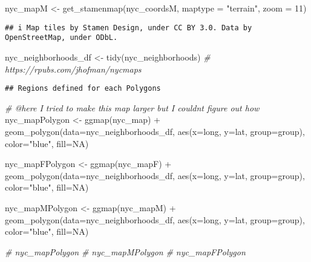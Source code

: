 \documentclass[
]{article}
\newenvironment{Shaded}{\begin{snugshade}}{\end{snugshade}}
\newcommand{\AttributeTok}[1]{\textcolor[rgb]{0.77,0.63,0.00}{#1}}
\newcommand{\CommentTok}[1]{\textcolor[rgb]{0.56,0.35,0.01}{\textit{#1}}}
\newcommand{\ConstantTok}[1]{\textcolor[rgb]{0.00,0.00,0.00}{#1}}
\newcommand{\DecValTok}[1]{\textcolor[rgb]{0.00,0.00,0.81}{#1}}
\newcommand{\FunctionTok}[1]{\textcolor[rgb]{0.00,0.00,0.00}{#1}}
\newcommand{\NormalTok}[1]{#1}
\newcommand{\OtherTok}[1]{\textcolor[rgb]{0.56,0.35,0.01}{#1}}
\newcommand{\SpecialCharTok}[1]{\textcolor[rgb]{0.00,0.00,0.00}{#1}}
\newcommand{\StringTok}[1]{\textcolor[rgb]{0.31,0.60,0.02}{#1}}
\begin{document}
\begin{Shaded}
\begin{Highlighting}[]
\NormalTok{nyc\_mapM }\OtherTok{\textless{}{-}} \FunctionTok{get\_stamenmap}\NormalTok{(nyc\_coordsM, }\AttributeTok{maptype =} \StringTok{"terrain"}\NormalTok{, }\AttributeTok{zoom =} \DecValTok{11}\NormalTok{)}
\end{Highlighting}
\end{Shaded}

\begin{verbatim}
## i Map tiles by Stamen Design, under CC BY 3.0. Data by OpenStreetMap, under ODbL.
\end{verbatim}

\begin{Shaded}
\begin{Highlighting}[]
\NormalTok{nyc\_neighborhoods\_df }\OtherTok{\textless{}{-}} \FunctionTok{tidy}\NormalTok{(nyc\_neighborhoods) }\CommentTok{\# https://rpubs.com/jhofman/nycmaps}
\end{Highlighting}
\end{Shaded}

\begin{verbatim}
## Regions defined for each Polygons
\end{verbatim}

\begin{Shaded}
\begin{Highlighting}[]
\CommentTok{\# @here I tried to make this map larger but I couldn\textquotesingle{}t figure out how}
\NormalTok{nyc\_mapPolygon }\OtherTok{\textless{}{-}} \FunctionTok{ggmap}\NormalTok{(nyc\_map) }\SpecialCharTok{+}
  \FunctionTok{geom\_polygon}\NormalTok{(}\AttributeTok{data=}\NormalTok{nyc\_neighborhoods\_df, }\FunctionTok{aes}\NormalTok{(}\AttributeTok{x=}\NormalTok{long, }\AttributeTok{y=}\NormalTok{lat, }\AttributeTok{group=}\NormalTok{group), }\AttributeTok{color=}\StringTok{"blue"}\NormalTok{, }\AttributeTok{fill=}\ConstantTok{NA}\NormalTok{)}

\NormalTok{nyc\_mapFPolygon }\OtherTok{\textless{}{-}} \FunctionTok{ggmap}\NormalTok{(nyc\_mapF) }\SpecialCharTok{+}
  \FunctionTok{geom\_polygon}\NormalTok{(}\AttributeTok{data=}\NormalTok{nyc\_neighborhoods\_df, }\FunctionTok{aes}\NormalTok{(}\AttributeTok{x=}\NormalTok{long, }\AttributeTok{y=}\NormalTok{lat, }\AttributeTok{group=}\NormalTok{group), }\AttributeTok{color=}\StringTok{"blue"}\NormalTok{, }\AttributeTok{fill=}\ConstantTok{NA}\NormalTok{)}

\NormalTok{nyc\_mapMPolygon }\OtherTok{\textless{}{-}} \FunctionTok{ggmap}\NormalTok{(nyc\_mapM) }\SpecialCharTok{+} 
  \FunctionTok{geom\_polygon}\NormalTok{(}\AttributeTok{data=}\NormalTok{nyc\_neighborhoods\_df, }\FunctionTok{aes}\NormalTok{(}\AttributeTok{x=}\NormalTok{long, }\AttributeTok{y=}\NormalTok{lat, }\AttributeTok{group=}\NormalTok{group), }\AttributeTok{color=}\StringTok{"blue"}\NormalTok{, }\AttributeTok{fill=}\ConstantTok{NA}\NormalTok{)}

\CommentTok{\# nyc\_mapPolygon}
\CommentTok{\# nyc\_mapMPolygon}
\CommentTok{\# nyc\_mapFPolygon}
\end{Highlighting}
\end{Shaded}
\end{document}
